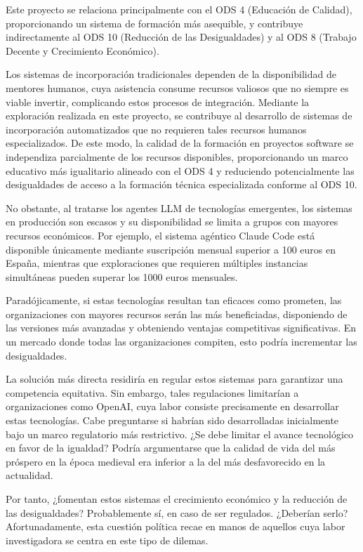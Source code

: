 Este proyecto se relaciona principalmente con el ODS 4 (Educación de Calidad), proporcionando un sistema de formación más asequible, y contribuye indirectamente al ODS 10 (Reducción de las Desigualdades) y al ODS 8 (Trabajo Decente y Crecimiento Económico).

Los sistemas de incorporación tradicionales dependen de la disponibilidad de mentores humanos, cuya asistencia consume recursos valiosos que no siempre es viable invertir, complicando estos procesos de integración. Mediante la exploración realizada en este proyecto, se contribuye al desarrollo de sistemas de incorporación automatizados que no requieren tales recursos humanos especializados. De este modo, la calidad de la formación en proyectos software se independiza parcialmente de los recursos disponibles, proporcionando un marco educativo más igualitario alineado con el ODS 4 y reduciendo potencialmente las desigualdades de acceso a la formación técnica especializada conforme al ODS 10.

No obstante, al tratarse los agentes LLM de tecnologías emergentes, los sistemas en producción son escasos y su disponibilidad se limita a grupos con mayores recursos económicos. Por ejemplo, el sistema agéntico Claude Code está disponible únicamente mediante suscripción mensual superior a 100 euros en España, mientras que exploraciones que requieren múltiples instancias simultáneas pueden superar los 1000 euros mensuales.

Paradójicamente, si estas tecnologías resultan tan eficaces como prometen, las organizaciones con mayores recursos serán las más beneficiadas, disponiendo de las versiones más avanzadas y obteniendo ventajas competitivas significativas. En un mercado donde todas las organizaciones compiten, esto podría incrementar las desigualdades.

La solución más directa residiría en regular estos sistemas para garantizar una competencia equitativa. Sin embargo, tales regulaciones limitarían a organizaciones como OpenAI, cuya labor consiste precisamente en desarrollar estas tecnologías. Cabe preguntarse si habrían sido desarrolladas inicialmente bajo un marco regulatorio más restrictivo. ¿Se debe limitar el avance tecnológico en favor de la igualdad? Podría argumentarse que la calidad de vida del más próspero en la época medieval era inferior a la del más desfavorecido en la actualidad.

Por tanto, ¿fomentan estos sistemas el crecimiento económico y la reducción de las desigualdades? Probablemente sí, en caso de ser regulados. ¿Deberían serlo? Afortunadamente, esta cuestión política recae en manos de aquellos cuya labor investigadora se centra en este tipo de dilemas.

